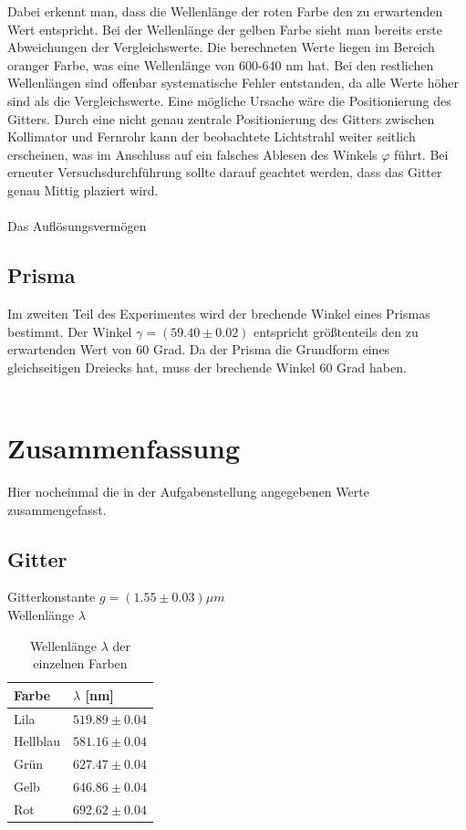 \documentclass[12pt,a4paper,twoside]{article}
\begin{document}
\noindent
Dabei erkennt man, dass die Wellenlänge der roten Farbe den zu erwartenden Wert entspricht. 
Bei der Wellenlänge der gelben Farbe sieht man bereits erste Abweichungen der Vergleichswerte. Die berechneten Werte liegen im Bereich oranger Farbe, was eine Wellenlänge von 600-640 nm hat. 
Bei den restlichen Wellenlängen sind offenbar systematische Fehler entstanden, da alle Werte höher sind als die Vergleichswerte. Eine mögliche Ursache wäre die Positionierung des Gitters. 
Durch eine nicht genau zentrale Positionierung des Gitters zwischen Kollimator und Fernrohr kann der beobachtete Lichtstrahl weiter seitlich erscheinen, was im Anschluss auf ein falsches Ablesen des Winkels $\varphi$ führt.
Bei erneuter Versuchsdurchführung sollte darauf geachtet werden, dass das Gitter genau Mittig plaziert wird. 
\\
\\
Das Auflösungsvermögen
\subsection{Prisma}
Im zweiten Teil des Experimentes wird der brechende Winkel eines Prismas bestimmt. Der Winkel $\gamma = (59.40 \pm 0.02)$ entspricht größtenteils den zu erwartenden Wert von 60 Grad. 
Da der Prisma die Grundform eines gleichseitigen Dreiecks hat, muss der brechende Winkel 60 Grad haben. 
\\
\\


\section{Zusammenfassung} %
Hier nocheinmal die in der Aufgabenstellung angegebenen Werte zusammengefasst. 

\subsection{Gitter}
Gitterkonstante  $g = (1.55 \pm 0.03)\mu m$ \\
Wellenlänge $\lambda$

\begin{table}[H]
    \centering
    \caption{Wellenlänge $\lambda$ der einzelnen Farben}
    \label{tab:zus wellenlänge gitter}
    \begin{tabular}{| l | l |}
        \hline
        Farbe & $\lambda$ [nm] \\
        \hline
        Lila        & $ 519.89 \pm 0.04 $ \\
        Hellblau    & $ 581.16 \pm 0.04 $ \\
        Grün        & $ 627.47 \pm 0.04 $ \\
        Gelb        & $ 646.86 \pm 0.04 $ \\
        Rot         & $ 692.62 \pm 0.04 $ \\
        \hline
    \end{tabular}
\end{table}
\end{document}
